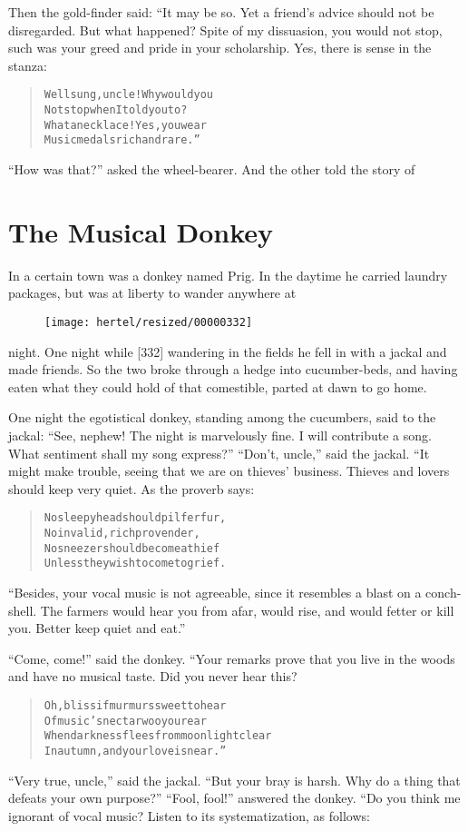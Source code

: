 \documentclass[article, twoside, 10pt]{memoir}
\renewenvironment{verbatim}{%
\begin{quote}%
\vskip -10pt%
\begin{alltt}\normalfont\small}{\end{alltt}%
\end{quote}%
\vskip -10pt
} %
\begin{document}
Then the gold-finder said: “It may be so. Yet a friend's advice
should not be disregarded. But what happened? Spite of my
dissuasion, you would not stop, such was your greed and pride in
your scholarship. Yes, there is sense in the stanza:

\begin{verbatim}
Well sung, uncle! Why would you
Not stop when I told you to?
What a necklace! Yes, you wear
Music medals rich and rare.”
\end{verbatim}
``How was that?'' asked the wheel-bearer. And the other told the
story of

\chapter{The Musical Donkey}

In a certain town was a donkey named Prig. In the daytime he
carried laundry packages, but was at liberty to wander anywhere at
\begin{figure}[p]\texttt{[image: hertel/resized/00000332]}\end{figure}night. One night while [332] wandering in the fields he fell in
with a jackal and made friends. So the two broke through a hedge
into cucumber-beds, and having eaten what they could hold of that
comestible, parted at dawn to go home.

One night the egotistical donkey, standing among the cucumbers,
said to the jackal:
``See, nephew! The night is marvelously fine. I will contribute a song. What sentiment shall my song express?''
``Don't, uncle,'' said the jackal. “It might make trouble, seeing
that we are on thieves' business. Thieves and lovers should keep
very quiet. As the proverb says:

\begin{verbatim}
No sleepyhead should pilfer fur,
No invalid, rich provender,
No sneezer should become a thief{\textemdash}
Unless they wish to come to grief.
\end{verbatim}
``Besides, your vocal music is not agreeable, since it resembles a blast on a conch-shell. The farmers would hear you from afar, would rise, and would fetter or kill you. Better keep quiet and eat.''

``Come, come!'' said the donkey. “Your remarks prove that you live
in the woods and have no musical taste. Did you never hear this?

\begin{verbatim}
Oh, bliss if murmurs sweet to hear
Of music's nectar woo your ear
When darkness flees from moonlight clear
In autumn, and your love is near.”
\end{verbatim}
``Very true, uncle,'' said the jackal.
``But your bray is harsh. Why do a thing that defeats your own purpose?''
``Fool, fool!'' answered the donkey. “Do you think me ignorant of
vocal music? Listen to its systematization, as follows:
\end{document}
